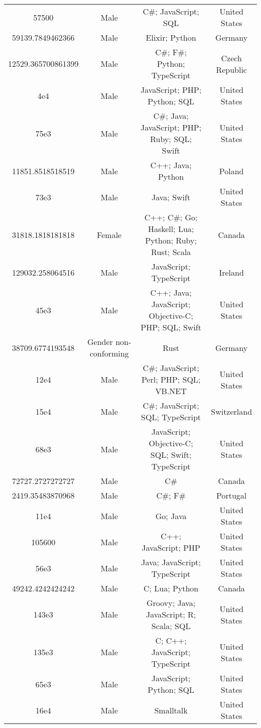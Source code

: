\begin{center}
\begin{tabular}{ |c|c|c|c| }
57500  &  Male  &  C\#; JavaScript; SQL  &  United States  \\ 
59139.7849462366  &  Male  &  Elixir; Python  &  Germany  \\ 
12529.365700861399  &  Male  &  C\#; F\#; Python; TypeScript  &  Czech Republic  \\ 
4e4  &  Male  &  JavaScript; PHP; Python; SQL  &  United States  \\ 
75e3  &  Male  &  C\#; Java; JavaScript; PHP; Ruby; SQL; Swift  &  United States  \\ 
11851.8518518519  &  Male  &  C++; Java; Python  &  Poland  \\ 
73e3  &  Male  &  Java; Swift  &  United States  \\ 
31818.1818181818  &  Female  &  C++; C\#; Go; Haskell; Lua; Python; Ruby; Rust; Scala  &  Canada  \\ 
129032.258064516  &  Male  &  JavaScript; TypeScript  &  Ireland  \\ 
45e3  &  Male  &  C++; Java; JavaScript; Objective-C; PHP; SQL; Swift  &  United States  \\ 
38709.6774193548  &  Gender non-conforming  &  Rust  &  Germany  \\ 
12e4  &  Male  &  C\#; JavaScript; Perl; PHP; SQL; VB.NET  &  United States  \\ 
15e4  &  Male  &  C\#; JavaScript; SQL; TypeScript  &  Switzerland  \\ 
68e3  &  Male  &  JavaScript; Objective-C; SQL; Swift; TypeScript  &  United States  \\ 
72727.2727272727  &  Male  &  C\#  &  Canada  \\ 
2419.35483870968  &  Male  &  C\#; F\#  &  Portugal  \\ 
11e4  &  Male  &  Go; Java  &  United States  \\ 
105600  &  Male  &  C++; JavaScript; PHP  &  United States  \\ 
56e3  &  Male  &  Java; JavaScript; TypeScript  &  United States  \\ 
49242.4242424242  &  Male  &  C; Lua; Python  &  Canada  \\ 
143e3  &  Male  &  Groovy; Java; JavaScript; R; Scala; SQL  &  United States  \\ 
135e3  &  Male  &  C; C++; JavaScript; TypeScript  &  United States  \\ 
65e3  &  Male  &  JavaScript; Python; SQL  &  United States  \\ 
16e4  &  Male  &  Smalltalk  &  United States  \\ 

\end{tabular}
\end{center}
